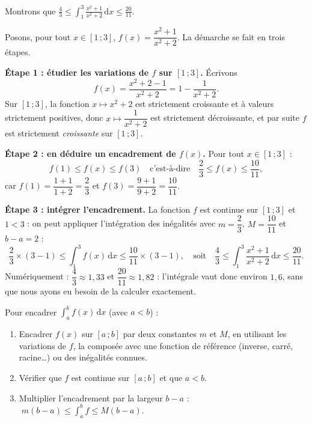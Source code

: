 \documentclass[11pt]{article}
\begin{document}
\begin{exemplebox}
Montrons que $\displaystyle \frac{4}{3} \leq \int_1^3 \frac{x^2+1}{x^2+2}\,\mathrm{d}x \leq \frac{20}{11}$.

Posons, pour tout $x \in [1\,;3]$, $f(x) = \dfrac{x^2+1}{x^2+2}$. La démarche se fait en trois étapes.

\textbf{Étape 1 : étudier les variations de $f$ sur $[1\,;3]$.} Écrivons
\[ f(x) = \frac{x^2+2-1}{x^2+2} = 1 - \frac{1}{x^2+2}. \]
Sur $[1\,;3]$, la fonction $x \mapsto x^2 + 2$ est strictement croissante et à valeurs strictement positives, donc $x \mapsto \dfrac{1}{x^2+2}$ est strictement décroissante, et par suite $f$ est strictement \emph{croissante} sur $[1\,;3]$.

\textbf{Étape 2 : en déduire un encadrement de $f(x)$.} Pour tout $x \in [1\,;3]$ :
\[ f(1) \leq f(x) \leq f(3) \quad\text{c'est-à-dire}\quad \frac{2}{3} \leq f(x) \leq \frac{10}{11}, \]
car $f(1) = \dfrac{1+1}{1+2} = \dfrac{2}{3}$ et $f(3) = \dfrac{9+1}{9+2} = \dfrac{10}{11}$.

\textbf{Étape 3 : intégrer l'encadrement.} La fonction $f$ est continue sur $[1\,;3]$ et $1 < 3$ : on peut appliquer l'intégration des inégalités avec $m = \dfrac{2}{3}$, $M = \dfrac{10}{11}$ et $b - a = 2$ :
\[ \frac{2}{3}\times(3-1) \leq \int_1^3 f(x)\,\mathrm{d}x \leq \frac{10}{11}\times(3-1), \quad\text{soit}\quad \frac{4}{3} \leq \int_1^3 \frac{x^2+1}{x^2+2}\,\mathrm{d}x \leq \frac{20}{11}. \]
Numériquement : $\dfrac{4}{3} \approx 1{,}33$ et $\dfrac{20}{11} \approx 1{,}82$ : l'intégrale vaut donc environ $1{,}6$, sans que nous ayons eu besoin de la calculer exactement.
\end{exemplebox}

\begin{methode}
Pour encadrer $\displaystyle\int_a^b f(x)\,\mathrm{d}x$ (avec $a < b$) :
\begin{enumerate}
\item Encadrer $f(x)$ sur $[a\,;b]$ par deux constantes $m$ et $M$, en utilisant les variations de $f$, la composée avec une fonction de référence (inverse, carré, racine\ldots) ou des inégalités connues.
\item Vérifier que $f$ est continue sur $[a\,;b]$ et que $a < b$.
\item Multiplier l'encadrement par la largeur $b - a$ : $\; m(b-a) \leq \displaystyle\int_a^b f \leq M(b-a)$.
\end{enumerate}
\end{methode}
\end{document}
